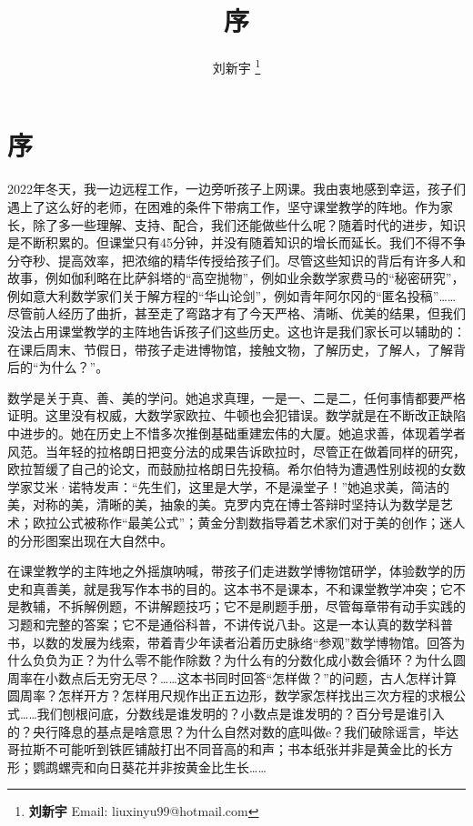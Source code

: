 \documentclass[b5paper]{ctexart}
\begin{document}
\title{序}

\author{刘新宇
\thanks{{\bfseries 刘新宇} \newline
  Email: liuxinyu99@hotmail.com \newline}
  }

\maketitle
\fi


\chapter*{序}

2022年冬天，我一边远程工作，一边旁听孩子上网课。我由衷地感到幸运，孩子们遇上了这么好的老师，在困难的条件下带病工作，坚守课堂教学的阵地。作为家长，除了多一些理解、支持、配合，我们还能做些什么呢？随着时代的进步，知识是不断积累的。但课堂只有45分钟，并没有随着知识的增长而延长。我们不得不争分夺秒、提高效率，把浓缩的精华传授给孩子们。尽管这些知识的背后有许多人和故事，例如伽利略在比萨斜塔的“高空抛物”，例如业余数学家费马的“秘密研究”，例如意大利数学家们关于解方程的“华山论剑”，例如青年阿尔冈的“匿名投稿”……尽管前人经历了曲折，甚至走了弯路才有了今天严格、清晰、优美的结果，但我们没法占用课堂教学的主阵地告诉孩子们这些历史。这也许是我们家长可以辅助的：在课后周末、节假日，带孩子走进博物馆，接触文物，了解历史，了解人，了解背后的“为什么？”。

数学是关于真、善、美的学问。她追求真理，一是一、二是二，任何事情都要严格证明。这里没有权威，大数学家欧拉、牛顿也会犯错误。数学就是在不断改正缺陷中进步的。她在历史上不惜多次推倒基础重建宏伟的大厦。她追求善，体现着学者风范。当年轻的拉格朗日把变分法的成果告诉欧拉时，尽管正在做着同样的研究，欧拉暂缓了自己的论文，而鼓励拉格朗日先投稿。希尔伯特为遭遇性别歧视的女数学家艾米·诺特发声：“先生们，这里是大学，不是澡堂子！”她追求美，简洁的美，对称的美，清晰的美，抽象的美。克罗内克在博士答辩时坚持认为数学是艺术；欧拉公式被称作“最美公式”；黄金分割数指导着艺术家们对于美的创作；迷人的分形图案出现在大自然中。

在课堂教学的主阵地之外摇旗呐喊，带孩子们走进数学博物馆研学，体验数学的历史和真善美，就是我写作本书的目的。这本书不是课本，不和课堂教学冲突；它不是教辅，不拆解例题，不讲解题技巧；它不是刷题手册，尽管每章带有动手实践的习题和完整的答案；它不是通俗科普，不讲传说八卦。这是一本认真的数学科普书，以数的发展为线索，带着青少年读者沿着历史脉络“参观”数学博物馆。回答为什么负负为正？为什么零不能作除数？为什么有的分数化成小数会循环？为什么圆周率在小数点后无穷无尽？……这本书同时回答“怎样做？”的问题，古人怎样计算圆周率？怎样开方？怎样用尺规作出正五边形，数学家怎样找出三次方程的求根公式……我们刨根问底，分数线是谁发明的？小数点是谁发明的？百分号是谁引入的？央行降息的基点是啥意思？为什么自然对数的底叫做e？我们破除谣言，毕达哥拉斯不可能听到铁匠铺敲打出不同音高的和声；书本纸张并非是黄金比的长方形；鹦鹉螺壳和向日葵花并非按黄金比生长……
\end{document}
